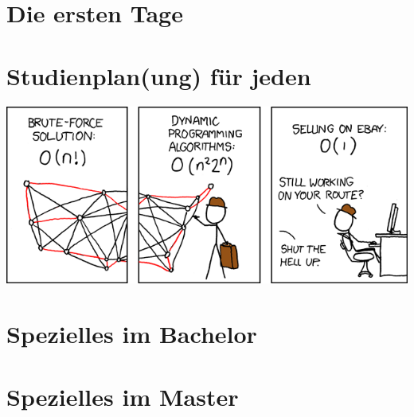 \documentclass[]{papertex}
\begin{document}
	\thispagestyle{empty}
	\clearpage

	\setcounter{page}{1}
	\tableofcontents
	
	\newpage

	\section{Die ersten Tage}
		
		
	\newpage

	\section{Studienplan(ung) für jeden}
		\label{studienplan}
		\begin{multicols}{2}
		
		\end{multicols}

		\vfill
		\begin{center}
			\includegraphics[width=\textwidth]{bilder/XKCD/travelling_salesman}
		\end{center}
		\vfill
	\newpage

	\section{Spezielles im Bachelor}
		\label{bachelor}
		\begin{multicols}{2}
		
		
		
		\end{multicols}
		
	\newpage

	\section{Spezielles im Master}
		\label{master}
		
	\newpage
\end{document}
